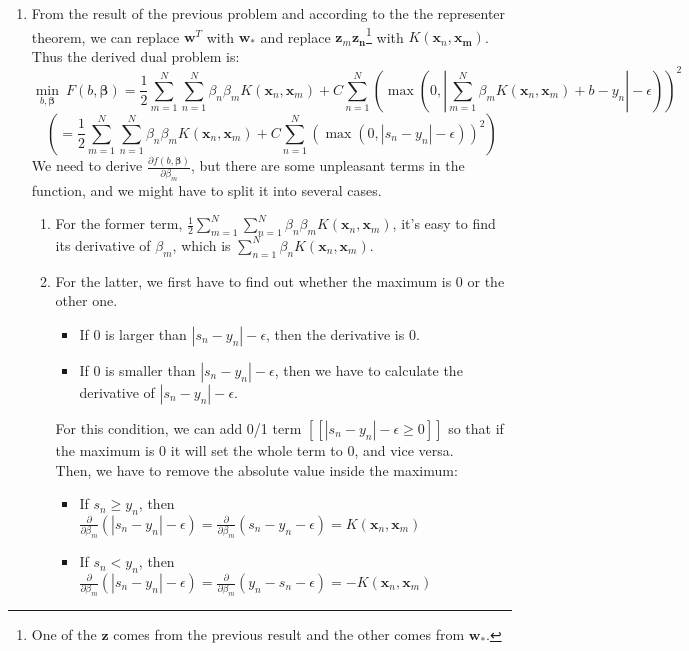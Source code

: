 \documentclass[11pt]{article}
\begin{document}
\begin{enumerate}[label=\textbf{\arabic*}.]
  \item From the result of the previous problem and according to the the representer theorem, we can replace $\mathbf{w}^T$ with $\mathbf{w}_*$ and replace $\mathbf{z}_m\mathbf{z_n}$\footnote{One of the $\mathbf{z}$ comes from the previous result and the other comes from $\mathbf{w}_*$.} with $K(\mathbf{x}_n, \mathbf{x_m})$. Thus the derived dual problem is: \[\underset{b, \bm{\beta}} \min \ F(b, \bm{\beta}) = \frac{1}{2} \sum_{m=1}^N \sum_{n=1}^N \beta_n \beta_m K(\mathbf{x}_n, \mathbf{x}_m) + C \sum_{n=1}^N \left(\max \left(0, |\sum_{m=1}^N \beta_m K(\mathbf{x}_n, \mathbf{x}_m)+b-y_n|-\epsilon \right) \right)^2 \] \[\left(= \frac{1}{2} \sum_{m=1}^N \sum_{n=1}^N \beta_n \beta_m K(\mathbf{x}_n, \mathbf{x}_m) + C \sum_{n=1}^N \left(\max \left(0, |s_n -y_n|-\epsilon \right) \right)^2 \right)\]
  We need to derive $\frac{\partial f(b, \bm{\beta})}{\partial \beta_m}$, but there are some unpleasant terms in the function, and we might have to split it into several cases. 
  \begin{enumerate}
    \item For the former term, $\frac{1}{2} \sum_{m=1}^N \sum_{n=1}^N \beta_n \beta_m K(\mathbf{x}_n, \mathbf{x}_m )$, it's easy to find its derivative of $\beta_m$, which is $\sum_{n=1}^N \beta_{n} K(\mathbf{x}_n, \mathbf{x}_m)$.
    \item For the latter, we first have to find out whether the maximum is $0$ or the other one.
    \begin{itemize}
      \item If 0 is larger than $|s_n -y_n|-\epsilon$, then the derivative is 0.
      \item If 0 is smaller than $|s_n -y_n|-\epsilon$, then we have to calculate the derivative of $|s_n -y_n|-\epsilon$.
    \end{itemize}
    For this condition, we can add 0/1 term $[\![|s_n-y_n| - \epsilon \geq 0]\!]$ so that if the maximum is 0 it will set the whole term to 0, and vice versa.\\
    Then, we have to remove the absolute value inside the maximum:
    \begin{itemize}
      \item If $s_n \geq y_n$, then $\frac{\partial}{\partial \beta_m} (|s_n -y_n|-\epsilon) = \frac{\partial}{\partial \beta_m}(s_n -y_n-\epsilon) = K(\mathbf{x}_n, \mathbf{x}_m)$
      \item If $s_n < y_n$, then $\frac{\partial}{\partial \beta_m} (|s_n -y_n|-\epsilon) = \frac{\partial}{\partial \beta_m}(y_n -s_n-\epsilon) = -K(\mathbf{x}_n, \mathbf{x}_m)$

\end{itemize}
\end{enumerate}
\end{enumerate}
\end{document}
